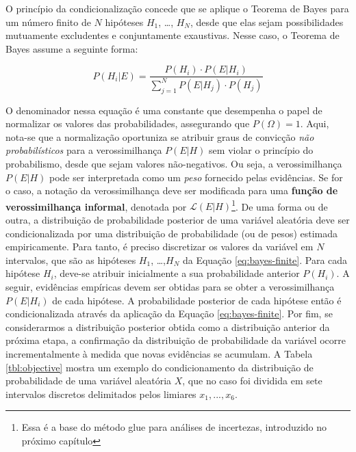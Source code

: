 \documentclass[./main.tex]{subfiles}
\begin{document}
\par O princípio da condicionalização concede que se aplique o Teorema de Bayes para um número finito de $N$ hipóteses $H_1$, …, $H_N$, desde que elas sejam possibilidades mutuamente excludentes e conjuntamente exaustivas. Nesse caso, o Teorema de Bayes assume a seguinte forma:
\begin{linenomath*}
\begin{equation}
\label{eq:bayes-finite}
    P(H_i | E) = \frac{P(H_i) \cdot P(E | H_i)}{\sum_{j=1}^{N}P(E | H_j) \cdot P(H_j)}
\end{equation}
\end{linenomath*}
O denominador nessa equação é uma constante que desempenha o papel de normalizar os valores das probabilidades,  assegurando que $P(\Omega) = 1$. Aqui, nota-se que a normalização oportuniza se atribuir graus de convicção \textit{não probabilísticos} para a verossimilhança $P(E | H)$ sem violar o princípio do probabilismo, desde que sejam valores não-negativos. Ou seja, a verossimilhança $P(E | H)$ pode ser interpretada como um \textit{peso} fornecido pelas evidências. Se for o caso, a notação da verossimilhança deve ser modificada para uma \textbf{função de verossimilhança informal}, denotada por $\mathcal{L}(E|H)$\footnote{Essa é a base do método \acrfull{glue} para análises de incertezas, introduzido no próximo capítulo}. De uma forma ou de outra, a distribuição de probabilidade posterior de uma variável aleatória deve ser condicionalizada por uma distribuição de probabilidade (ou de pesos) estimada empiricamente. Para tanto, é preciso discretizar os valores da variável em $N$ intervalos, que são as hipóteses $H_1$, …,$H_N$ da Equação \eqref{eq:bayes-finite}. Para cada hipótese $H_i$, deve-se atribuir inicialmente a sua probabilidade anterior $P(H_i)$. A seguir, evidências empíricas devem ser obtidas para se obter a verossimilhança $P(E | H_i)$ de cada hipótese. A probabilidade posterior de cada hipótese então é condicionalizada através da aplicação da Equação \eqref{eq:bayes-finite}. Por fim, se considerarmos a distribuição posterior obtida como a distribuição anterior da próxima etapa, a confirmação da distribuição de probabilidade da variável ocorre incrementalmente à medida que novas evidências se acumulam. A Tabela \ref{tbl:objective} mostra um exemplo do condicionamento da distribuição de probabilidade de uma variável aleatória $X$, que no caso foi dividida em sete intervalos discretos delimitados pelos limiares $x_1, ..., x_6$.
\end{document}
